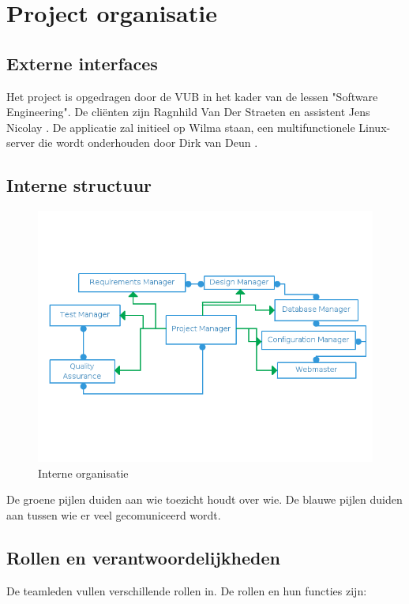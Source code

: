 \section{Project organisatie}

\subsection{Externe interfaces}
Het project is opgedragen door de VUB in het kader van de lessen "Software Engineering". De cliënten zijn Ragnhild Van Der Straeten \cite{rvdstrae} en assistent Jens Nicolay \cite{jnicolay}. De applicatie zal initieel op Wilma \cite{Wilma} staan, een multifunctionele Linux-server die wordt onderhouden door Dirk van Deun \cite{dvdeun}. \\

\subsection{Interne structuur}

\begin{figure}[h]
\centering
\includegraphics[width=\linewidth]{./Wiselib_intOrg.png}
\caption{Interne organisatie}
\label{fig:intorg}
\end{figure}

De groene pijlen duiden aan wie toezicht houdt over wie.\newline 
De blauwe pijlen duiden aan tussen wie er veel gecomuniceerd wordt.

\subsection{Rollen en verantwoordelijkheden}
De teamleden vullen verschillende rollen in.
De rollen en hun functies zijn: 

